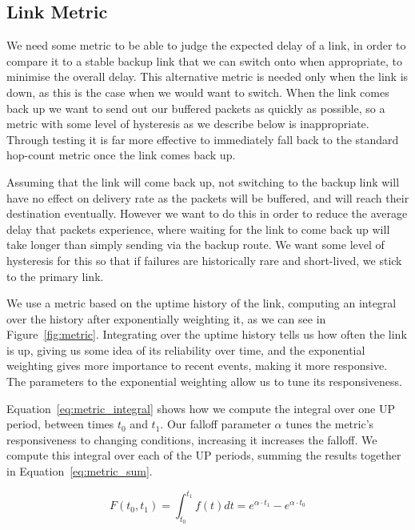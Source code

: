 \documentclass[withindex,glossary,openany]{cam-thesis}
\begin{document}
\subsection{Link Metric}

We need some metric to be able to judge the expected delay of a link, in order to compare it to a stable backup link that we can switch onto when appropriate, to minimise the overall delay. This alternative metric is needed only when the link is down, as this is the case when we would want to switch. When the link comes back up we want to send out our buffered packets as quickly as possible, so a metric with some level of hysteresis as we describe below is inappropriate. Through testing it is far more effective to immediately fall back to the standard hop-count metric once the link comes back up.

Assuming that the link will come back up, not switching to the backup link will have no effect on delivery rate as the packets will be buffered, and will reach their destination eventually. However we want to do this in order to reduce the average delay that packets experience, where waiting for the link to come back up will take longer than simply sending via the backup route. We want some level of hysteresis for this so that if failures are historically rare and short-lived, we stick to the primary link.

We use a metric based on the uptime history of the link, computing an integral over the history after exponentially weighting it, as we can see in Figure~\ref{fig:metric}. Integrating over the uptime history tells us how often the link is up, giving us some idea of its reliability over time, and the exponential weighting gives more importance to recent events, making it more responsive. The parameters to the exponential weighting allow us to tune its responsiveness.

Equation~\ref{eq:metric_integral} shows how we compute the integral over one UP period, between times $t_0$ and $t_1$. Our falloff parameter $\alpha$ tunes the metric's responsiveness to changing conditions, increasing it increases the falloff. We compute this integral over each of the UP periods, summing the results together in Equation~\ref{eq:metric_sum}.

\begin{equation} \label{eq:metric_integral}
F(t_0, t_1) = \int_{t_0}^{t_1} f(t)dt = e^{\alpha \cdot t_1} - e^{\alpha \cdot t_0}
\end{equation}
\end{document}
